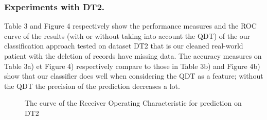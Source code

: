 \subsubsection{Experiments with DT2.}
Table 3 and Figure 4 respectively show the performance measures and the ROC curve of the results (with or without taking into account the QDT) 
of the our classification approach tested on dataset DT2 that is our cleaned real-world patient with the deletion of records have missing data.
The accuracy measures on Table 3a) et Figure 4) respectively compare to those in Table 3b) and Figure 4b) show that our classifier does well 
when considering the QDT as a feature; without the QDT the precision of the prediction decreases a lot. 



\begin{table}[!h]
\centering
{}%
\hspace*{0.5cm}
%
\label{perf-measure-dt2}\caption{Performance measures of the prediction on DT2}
\end{table}

\begin{figure}[!h]
\centering
{}%
\caption{The curve of the Receiver Operating Characteristic for prediction on DT2}\label{curve_roc_dt2}
\end{figure}

